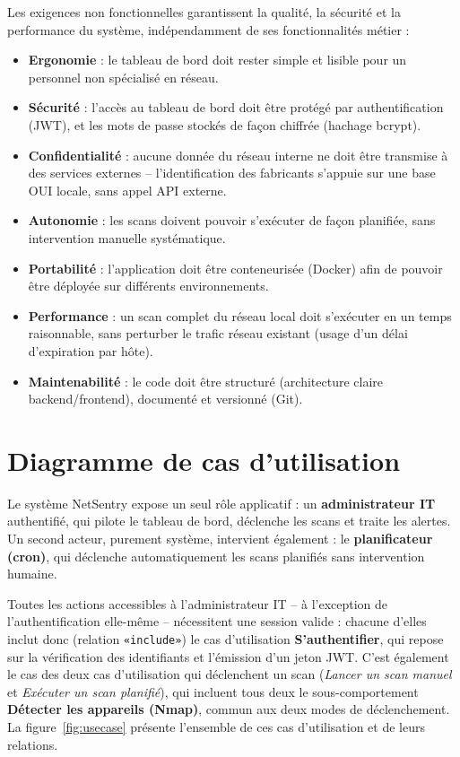 Les exigences non fonctionnelles garantissent la qualité, la sécurité et la performance
du système, indépendamment de ses fonctionnalités métier :

\begin{itemize}
    \item \textbf{Ergonomie} : le tableau de bord doit rester simple et lisible pour un
    personnel non spécialisé en réseau.
    \item \textbf{Sécurité} : l'accès au tableau de bord doit être protégé par
    authentification (JWT), et les mots de passe stockés de façon chiffrée (hachage
    bcrypt).
    \item \textbf{Confidentialité} : aucune donnée du réseau interne ne doit être
    transmise à des services externes -- l'identification des fabricants s'appuie sur une
    base OUI locale, sans appel API externe.
    \item \textbf{Autonomie} : les scans doivent pouvoir s'exécuter de façon planifiée,
    sans intervention manuelle systématique.
    \item \textbf{Portabilité} : l'application doit être conteneurisée (Docker) afin de
    pouvoir être déployée sur différents environnements.
    \item \textbf{Performance} : un scan complet du réseau local doit s'exécuter en un
    temps raisonnable, sans perturber le trafic réseau existant (usage d'un délai
    d'expiration par hôte).
    \item \textbf{Maintenabilité} : le code doit être structuré (architecture claire
    backend/frontend), documenté et versionné (Git).
\end{itemize}

\section{Diagramme de cas d'utilisation}

Le système NetSentry expose un seul rôle applicatif : un \textbf{administrateur IT}
authentifié, qui pilote le tableau de bord, déclenche les scans et traite les alertes.
Un second acteur, purement système, intervient également : le \textbf{planificateur
(cron)}, qui déclenche automatiquement les scans planifiés sans intervention humaine.

Toutes les actions accessibles à l'administrateur IT -- à l'exception de
l'authentification elle-même -- nécessitent une session valide : chacune d'elles inclut
donc (relation \texttt{«include»}) le cas d'utilisation \textbf{S'authentifier}, qui
repose sur la vérification des identifiants et l'émission d'un jeton JWT. C'est
également le cas des deux cas d'utilisation qui déclenchent un scan (\textit{Lancer un
scan manuel} et \textit{Exécuter un scan planifié}), qui incluent tous deux le
sous-comportement \textbf{Détecter les appareils (Nmap)}, commun aux deux modes de
déclenchement. La figure~\ref{fig:usecase} présente l'ensemble de ces cas d'utilisation
et de leurs relations.

